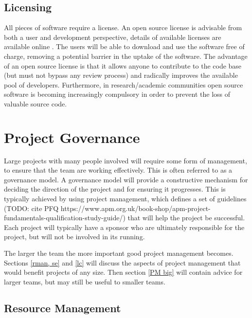\documentclass[jnr]{iosart2x}
\begin{document}
\subsection{Licensing}
\label{Licensing}

All pieces of software require a license.
An open source license is advisable from both a user and development perspective, details of available licenses are available online \cite{OSI_Licenses}.
The users will be able to download and use the software free of charge, removing a potential barrier in the uptake of the software.
The advantage of an open source license is that it allows anyone to contribute to the code base (but must not bypass any review process) and radically improves the available pool of developers.
Furthermore, in research/academic communities open source software is becoming increasingly compulsory in order to prevent the loss of valuable source code.

\section{Project Governance}
\label{Project Governance}

Large projects with many people involved will require some form of management, to ensure that the team are working effectively.
This is often referred to as a governance model.
A governance model will provide a constructive mechanism for deciding the direction of the project and for ensuring it progresses.
This is typically achieved by using project management, which defines a set of guidelines (TODO: cite PFQ https://www.apm.org.uk/book-shop/apm-project-fundamentals-qualification-study-guide/) that will help the project be successful.
Each project will typically have a sponsor who are ultimately responsible for the project, but will not be involved in its running.

The larger the team the more important good project management becomes.
Sections \ref{rman, se} and \ref{lc} will discuss the aspects of project management that would benefit projects of any size.
Then section \ref{PM big} will contain advice for larger teams, but may still be useful to smaller teams.

\subsection{Resource Management}
\label{rman}
\end{document}
